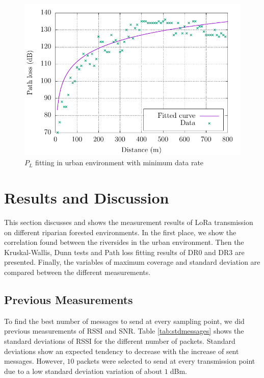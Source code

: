 \begin{figure}[!htb]
  \centering
  \includegraphics[width=\columnwidth]{Figure5}
  \caption{$P_L$ fitting in urban environment with minimum data rate}
  \label{fig:plfittiing}
\end{figure}

\section{Results and Discussion}

This section discusses and shows the measurement results of LoRa transmission on different riparian forested environments. In the first place, we show the correlation found between the riversides in the urban environment. Then the Kruskal-Wallis, Dunn tests and Path loss fitting results of DR$0$ and DR$3$ are presented. Finally, the variables of maximum coverage and standard deviation are compared between the different measurements.  

\subsection{Previous Measurements}

To find the best number of messages to send at every sampling point, we did previous measurements of RSSI and SNR. Table \ref{tab:stdmessages} shows the standard deviations of RSSI for the different number of packets. Standard deviations show an expected tendency to decrease with the increase of sent messages. However, $10$ packets were selected to send at every transmission point due to a low standard deviation variation of about $1\;$dBm. 

